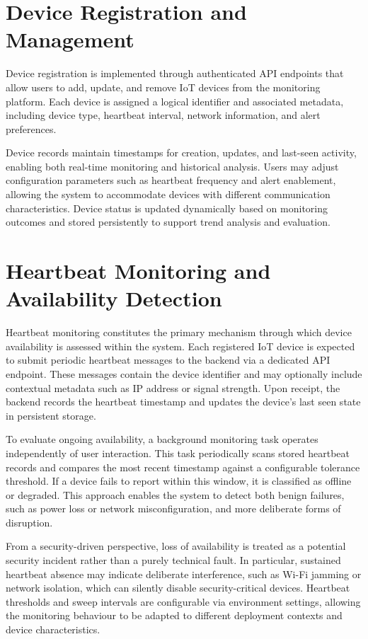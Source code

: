 \section{Device Registration and Management}

Device registration is implemented through authenticated API endpoints that allow users to add, update, and remove IoT devices from the monitoring platform. Each device is assigned a logical identifier and associated metadata, including device type, heartbeat interval, network information, and alert preferences.

Device records maintain timestamps for creation, updates, and last-seen activity, enabling both real-time monitoring and historical analysis. Users may adjust configuration parameters such as heartbeat frequency and alert enablement, allowing the system to accommodate devices with different communication characteristics. Device status is updated dynamically based on monitoring outcomes and stored persistently to support trend analysis and evaluation.

\section{Heartbeat Monitoring and Availability Detection}

Heartbeat monitoring constitutes the primary mechanism through which device availability is assessed within the system. Each registered IoT device is expected to submit periodic heartbeat messages to the backend via a dedicated API endpoint. These messages contain the device identifier and may optionally include contextual metadata such as IP address or signal strength. Upon receipt, the backend records the heartbeat timestamp and updates the device's last seen state in persistent storage.

To evaluate ongoing availability, a background monitoring task operates independently of user interaction. This task periodically scans stored heartbeat records and compares the most recent timestamp against a configurable tolerance threshold. If a device fails to report within this window, it is classified as offline or degraded. This approach enables the system to detect both benign failures, such as power loss or network misconfiguration, and more deliberate forms of disruption.

From a security-driven perspective, loss of availability is treated as a potential security incident rather than a purely technical fault. In particular, sustained heartbeat absence may indicate deliberate interference, such as Wi-Fi jamming or network isolation, which can silently disable security-critical devices. Heartbeat thresholds and sweep intervals are configurable via environment settings, allowing the monitoring behaviour to be adapted to different deployment contexts and device characteristics.

